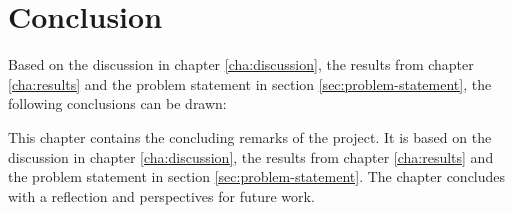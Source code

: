 \chapter{Conclusion}\label{cha:conclusion}
Based on the discussion in chapter \ref{cha:discussion}, the results from chapter \ref{cha:results} and the problem statement in section \ref{sec:problem-statement}, the following conclusions can be drawn:

This chapter contains the concluding remarks of the project. It is based on the discussion in chapter \ref{cha:discussion}, the results from chapter \ref{cha:results} and the problem statement in section \ref{sec:problem-statement}. The chapter concludes with a reflection and perspectives for future work.